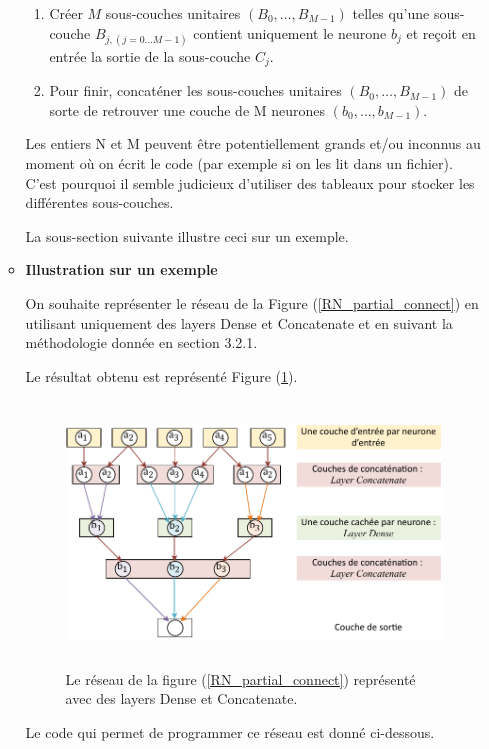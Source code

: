 \begin{itemize}[label=$\square$]
\begin{itemize}
\begin{enumerate}
\item Créer $M$ sous-couches unitaires $(B_0,\dots,B_{M-1})$ telles qu'une sous-couche $B_{j, (j=0 \dots M-1)}$ contient uniquement le neurone $b_j$ et reçoit en entrée la sortie de la sous-couche $C_j$. 

\item Pour finir, concaténer les sous-couches unitaires $(B_0,\dots,B_{M-1})$ de sorte de retrouver une couche de M neurones $(b_0, \dots, b_{M-1})$.

\end{enumerate}
\begin{Rem}
	Les entiers N et M peuvent être potentiellement grands et/ou inconnus au moment où on écrit le code (par exemple si on les lit dans un fichier). C'est pourquoi il semble judicieux d'utiliser des tableaux pour stocker les différentes sous-couches. 
\end{Rem}

La sous-section suivante illustre ceci sur un exemple.

\item 	\textbf{Illustration sur un exemple}

On souhaite représenter le réseau de la Figure (\ref{RN_partial_connect}) en utilisant uniquement des layers Dense et Concatenate et en suivant la méthodologie donnée en section 3.2.1.

Le résultat obtenu est représenté Figure (\ref{RN_pc_Dense_Concatenate}).


\begin{figure}[H]
	\centerline{
		\includegraphics[height=7cm]{images_these/RN_pc_Dense_Concatenate.pdf}}
	\caption[Le réseau de la figure (\ref{RN_partial_connect}) représenté avec des layers Dense et Concatenate.]{Le réseau de la figure (\ref{RN_partial_connect}) représenté avec des layers Dense et Concatenate.}
	\label{RN_pc_Dense_Concatenate}
\end{figure}
Le code qui permet de programmer ce réseau est donné ci-dessous.


\end{itemize}
\end{itemize}
